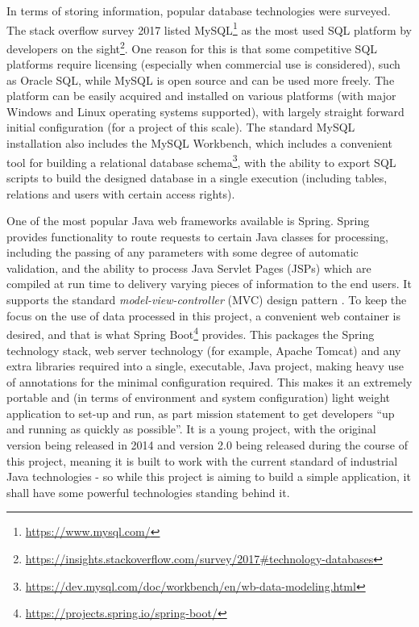 In terms of storing information, popular database technologies were surveyed. The stack overflow survey 2017 listed MySQL\footnote{\href{https://www.mysql.com/}{https://www.mysql.com/}} as the most used SQL platform by developers on the sight\footnote{\href{https://insights.stackoverflow.com/survey/2017\#technology-databases}{https://insights.stackoverflow.com/survey/2017\#technology-databases}}. One reason for this is that some competitive SQL platforms require licensing (especially when commercial use is considered), such as Oracle SQL, while MySQL is open source and can be used more freely. The platform can be easily acquired and installed on various platforms (with major Windows and Linux operating systems supported), with largely straight forward initial configuration (for a project of this scale). The standard MySQL installation also includes the MySQL Workbench, which includes a convenient tool for building a relational database schema\footnote{\href{https://dev.mysql.com/doc/workbench/en/wb-data-modeling.html}{https://dev.mysql.com/doc/workbench/en/wb-data-modeling.html}}, with the ability to export SQL scripts to build the designed database in a single execution (including tables, relations and users with certain access rights). 

One of the most popular Java web frameworks available is Spring. Spring provides functionality to route requests to certain Java classes for processing, including the passing of any parameters with some degree of automatic validation, and the ability to process Java Servlet Pages (JSPs) which are compiled at run time to delivery varying pieces of information to the end users. It supports the standard \textit{model-view-controller} (MVC) design pattern \cite{Deacon2005}. To keep the focus on the use of data processed in this project, a convenient web container is desired, and that is what Spring Boot\footnote{\href{https://projects.spring.io/spring-boot/}{https://projects.spring.io/spring-boot/}} provides. This packages the Spring technology stack, web server technology (for example, Apache Tomcat) and any extra libraries required into a single, executable, Java project, making heavy use of annotations for the minimal configuration required. This makes it an extremely portable and (in terms of environment and system configuration) light weight application to set-up and run, as part mission statement to get developers ``up and running as quickly as possible''. It is a young project, with the original version being released in 2014 and version 2.0 being released during the course of this project, meaning it is built to work with the current standard of industrial Java technologies - so while this project is aiming to build a simple application, it shall have some powerful technologies standing behind it.

